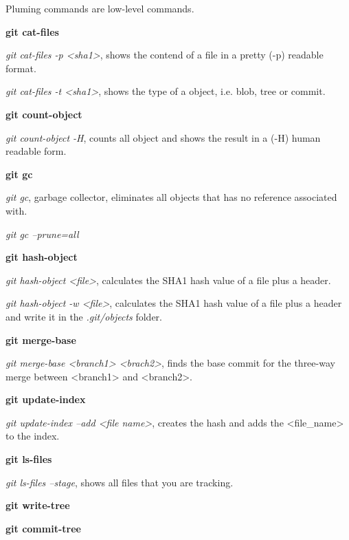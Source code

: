 \begin{refsection}
Pluming commands are low-level commands.

\vspace*{5mm} \noindent \textbf{git cat-files}

\noindent \emph{git cat-files -p <sha1>}, shows the contend of a file in a pretty (-p) readable format.

\noindent \emph{git cat-files -t <sha1>}, shows the type of a object, i.e. blob, tree or commit.

\vspace*{5mm} \noindent \textbf{git count-object}

\noindent \emph{git count-object -H}, counts all object and shows the result in a (-H) human readable form.

\vspace*{5mm} \noindent \textbf{git gc}

\noindent \emph{git gc}, garbage collector, eliminates all objects that has no reference associated with.

\noindent \emph{git gc --prune=all}


\vspace*{5mm} \noindent \textbf{git hash-object}

\noindent \emph{git hash-object <file>}, calculates the SHA1 hash value of a file plus a header.

\noindent \emph{git hash-object -w <file>}, calculates the SHA1 hash value of a file plus a header and write it in the \emph{.git/objects} folder.

\vspace*{5mm} \noindent \textbf{git merge-base}

\noindent \emph{git merge-base <branch1> <brach2>}, finds the base commit for the three-way merge between <branch1> and <branch2>.


\vspace*{5mm} \noindent \textbf{git update-index}

\noindent \emph{git update-index --add <file name>}, creates the hash and adds the <file\_name> to the index.

\vspace*{5mm} \noindent \textbf{git ls-files}

\noindent \emph{git ls-files --stage}, shows all files that you are tracking.

\vspace*{5mm} \noindent \textbf{git write-tree}

\vspace*{5mm} \noindent \textbf{git commit-tree}


\end{refsection}
